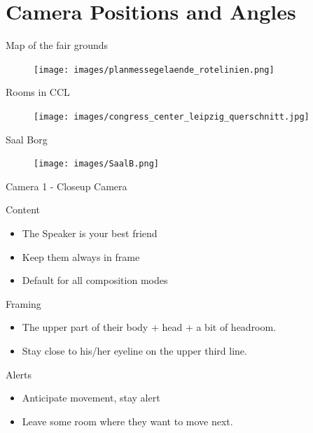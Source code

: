 \documentclass[aspectratio=169]{beamer}
\begin{document}
\section{Camera Positions and Angles}
\begin{frame}{Map of the fair grounds}
	\begin{figure} 
		\centering
		\texttt{[image: images/planmessegelaende\_rotelinien.png]}
	\end{figure}
\end{frame}

\begin{frame}{Rooms in CCL}
	\begin{figure} 
		\centering
		\texttt{[image: images/congress\_center\_leipzig\_querschnitt.jpg]}
	\end{figure}
\end{frame}

\begin{frame}{Saal Borg}
	\begin{figure} 
		\centering
		\texttt{[image: images/SaalB.png]}
	\end{figure}
\end{frame}

\begin{frame}{Camera 1 - Closeup Camera}
		\begin{block}{Content}
			\begin{itemize}
				\item The Speaker is your best friend
				\item Keep them always in frame
				\item Default for all composition modes
			\end{itemize}
		\end{block}
		
		\begin{block}{Framing}
			\begin{itemize}
				\item The upper part of their body + head + a bit of headroom.
				\item Stay close to his/her eyeline on the upper third line.
			\end{itemize}
		\end{block}

		\begin{alertblock}{Alerts}
			\begin{itemize}
				\item Anticipate movement, stay alert
				\item Leave some room where they want to move next.
			\end{itemize}
		\end{alertblock}
\end{frame}
\end{document}
